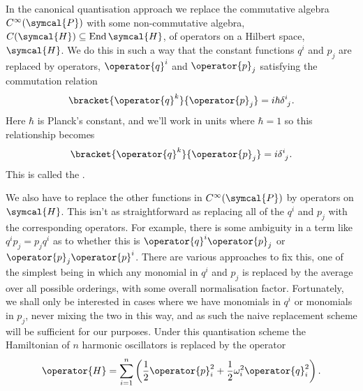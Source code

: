 \documentclass[fleqn]{NotesClass}
\newcommand{\phaseSpace}{\symcal{P}}
\newcommand{\hilbertSpace}{\symcal{H}}
\DeclareMathOperator{\End}{End}
\begin{document}
    In the canonical quantisation approach we replace the commutative algebra \(C^{\infty}(\phaseSpace)\) with some non-commutative algebra, \(C(\hilbertSpace) \subseteq \End \hilbertSpace\), of operators on a Hilbert space, \(\hilbertSpace\).
    We do this in such a way that the constant functions \(q^i\) and \(p_j\) are replaced by operators, \(\operator{q}^i\) and \(\operator{p}_j\) satisfying the commutation relation
    \begin{equation}
        \bracket{\operator{q}^k}{\operator{p}_j} = i\hbar\tensor{\delta}{^i_j}.
    \end{equation}
    Here \(\hbar\) is Planck's constant, and we'll work in units where \(\hbar = 1\) so this relationship becomes
    \begin{equation}
        \bracket{\operator{q}^k}{\operator{p}_j} = i\tensor{\delta}{^i_j}.
    \end{equation}
    This is called the .
    
    We also have to replace the other functions in \(C^{\infty}(\phaseSpace)\) by operators on \(\hilbertSpace\).
    This isn't as straightforward as replacing all of the \(q^i\) and \(p_j\) with the corresponding operators.
    For example, there is some ambiguity in a term like \(q^ip_j = p_jq^i\) as to whether this is \(\operator{q}^i\operator{p}_j\) or \(\operator{p}_j\operator{p}^i\).
    There are various approaches to fix this, one of the simplest being  in which any monomial in \(q^i\) and \(p_j\) is replaced by the average over all possible orderings, with some overall normalisation factor.
    Fortunately, we shall only be interested in cases where we have monomials in \(q^i\) or monomials in \(p_j\), never mixing the two in this way, and as such the naive replacement scheme will be sufficient for our purposes.
    Under this quantisation scheme the Hamiltonian of \(n\) harmonic oscillators is replaced by the operator
    \begin{equation}
        \operator{H} = \sum_{i=1}^n \left( \frac{1}{2}\operator{p}_i^2 + \frac{1}{2}\omega_i^2 \operator{q}_i^2 \right).
    \end{equation}
    
\end{document}
